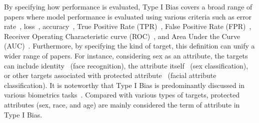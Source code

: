 \noindent
By specifying how performance is evaluated, Type I Bias covers a broad range of papers where model performance is evaluated using various criteria such as error rate~\cite{fairnessgan_DP_difference_error_rate}, loss~\cite{representation_disparity}, accuracy~\cite{multiaccuracy}, True Positive Rate (TPR)~\cite{pass}, False Positive Rate (FPR)~\cite{FPR_Penalty_Loss}, Receiver Operating Characteristic curve (ROC)~\cite{debias_balanced_AUCROC}, and Area Under the Curve (AUC)~\cite{DebFace}.
Furthermore, by specifying the kind of target, this definition can unify a wider range of papers.
For instance, considering sex as an attribute, the targets can include identity~\cite{DebFace, FairCal} (\eg face recognition), the attribute itself~\cite{Timnit_sex_classification_PPB,Fairface} (\eg sex classification), or other targets associated with protected attribute~\cite{minority_group_vs_sensitive_attribute,representation_disparity} (\eg facial attribute classification).
It is noteworthy that Type I Bias is predominantly discussed in various biometrics tasks~\cite{von_Mises_Fisher,FR_inherent_bias,SensitiveNets}. 
Compared with various types of targets, protected attributes (\eg sex, race, and age) are mainly considered the term of attribute in Type I Bias.

















